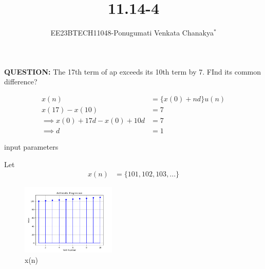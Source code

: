 \documentclass[journal,12pt,twocolumn]{IEEEtran}
\theoremstyle{remark}
\begin{document}
 
 \vspace{3cm}
 \title{\textbf{11.14-4}}
 \author{EE23BTECH11048-Ponugumati Venkata Chanakya$^{*}$%
 }
 \maketitle
 \newpage
 \bigskip
 \renewcommand{\thefigure}{\theenumi}
 \renewcommand{\thetable}{\theenumi}
 \textbf{QUESTION:}
 The 17th term of ap exceeds its 10th term by 7. FInd its common difference?\\
 \solution

 \begin{align}
     x(n) &= \{x(0)+nd\}u(n) \\
     x(17)-x(10) &= 7\\
    \implies {x(0)+17d}-{x(0)+10d} &= 7\\
    \implies d &= 1
 \end{align}

 
 \begin{table}[!ht]
    \centering
        
    \caption{input parameters}
    \label{tab:10_5_3_12}
\end{table}
Let \\
\begin{align}
x(n)&= \lbrace 101,102,103,...\rbrace 
\end{align}
\begin{figure}[h!]
    \centering
    \includegraphics[width=0.4\textwidth]{figs/fig1.png}
    \caption{x(n)}
\end{figure}
 
 
\end{document}
